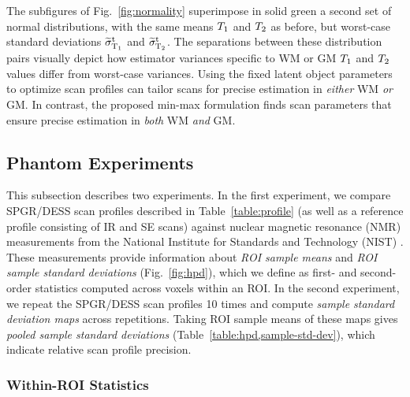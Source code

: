 The subfigures of Fig.~\ref{fig:normality} superimpose 
in solid green a second set of normal distributions, 
with the same means $T_1$ and $T_2$ as before, 
but worst-case standard deviations $\widetilde{\sigma}_{\mathrm{T}_1}^\mathrm{t}$ and $\widetilde{\sigma}_{\mathrm{T}_2}^\mathrm{t}$. 
The separations between these distribution pairs 
visually depict how estimator variances specific 
to WM or GM $T_1$ and $T_2$ values differ 
from worst-case variances. 
Using the fixed latent object parameters 
to optimize scan profiles can tailor scans 
for precise estimation in \emph{either} WM \emph{or} GM. 
In contrast, the proposed min-max formulation finds scan parameters 
that ensure precise estimation 
in \emph{both} WM \emph{and} GM.	

\subsection{Phantom Experiments}
\label{ss,scn-dsgn,exp,phant}

This subsection describes two experiments. 
In the first experiment, 
we compare SPGR/DESS scan profiles 
described in Table~\ref{table:profile} 
(as well as a reference profile consisting of IR and SE scans) 
against nuclear magnetic resonance (NMR) measurements 
from the National Institute for Standards and Technology (NIST) 
\cite{keenan:16:msm}.
These measurements provide information 
about \emph{ROI sample means} and \emph{ROI sample standard deviations} 
(Fig.~\ref{fig:hpd}), 
which we define as first- and second-order statistics 
computed across voxels within an ROI.
In the second experiment, 
we repeat the SPGR/DESS scan profiles 10 times 
and compute \emph{sample standard deviation maps} 
across repetitions. 
Taking ROI sample means of these maps 
gives \emph{pooled sample standard deviations} 
(Table~\ref{table:hpd,sample-std-dev}), 
which indicate relative scan profile precision.

\subsubsection{Within-ROI Statistics} 
\label{sss,scn-dsgn,exp,phant,roi}

